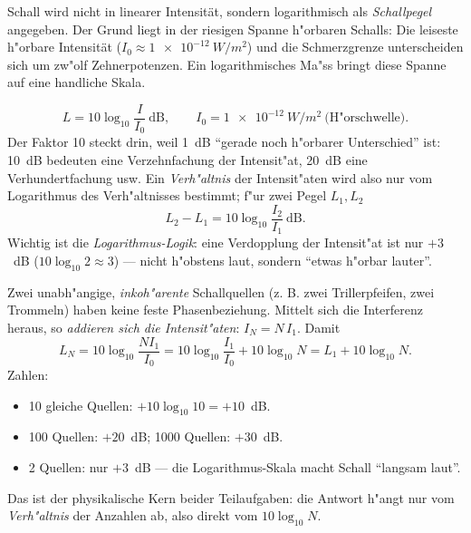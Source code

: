 

Schall wird nicht in linearer Intensität, sondern logarithmisch als
\emph{Schallpegel} angegeben. Der Grund liegt in der riesigen Spanne h"orbaren
Schalls: Die leiseste h"orbare Intensität ($I_0\approx\qty{1e-12}{W/m^2}$)
und die Schmerzgrenze unterscheiden sich um zw"olf Zehnerpotenzen. Ein
logarithmisches Ma"ss bringt diese Spanne auf eine handliche Skala.

\begin{werkzeugkasten}
\begin{equation}
  L=10\log_{10}\frac{I}{I_0}\ \mathrm{dB},\qquad
  I_0=\qty{1e-12}{W/m^2}\ \text{(H"orschwelle)}.
\end{equation}
Der Faktor 10 steckt drin, weil 1~dB ``gerade noch h"orbarer Unterschied''
ist: 10~dB bedeuten eine Verzehnfachung der Intensit"at, 20~dB eine
Verhundertfachung usw. Ein \emph{Verh"altnis} der Intensit"aten wird also nur
vom Logarithmus des Verh"altnisses bestimmt; f"ur zwei Pegel $L_1,L_2$
\begin{equation}
  L_2-L_1=10\log_{10}\frac{I_2}{I_1}\ \mathrm{dB}.
\end{equation}
Wichtig ist die \emph{Logarithmus-Logik}: eine Verdopplung der Intensit"at
ist nur $+3$~dB ($10\log_{10}2\approx3$) --- nicht h"obstens laut, sondern
``etwas h"orbar lauter''.
\end{werkzeugkasten}

\begin{werkzeugkasten}
Zwei unabh"angige, \emph{inkoh"arente} Schallquellen (z. B. zwei Trillerpfeifen,
zwei Trommeln) haben keine feste Phasenbeziehung. Mittelt sich die
Interferenz heraus, so \emph{addieren sich die Intensit"aten}: $I_N=N\,I_1$.
Damit
\begin{equation}
  L_N=10\log_{10}\frac{N I_1}{I_0}
  =10\log_{10}\frac{I_1}{I_0}+10\log_{10}N
  =L_1+10\log_{10}N.
\end{equation}
Zahlen:
\begin{itemize}
  \item 10 gleiche Quellen: $+10\log_{10}10=+10$~dB.
  \item 100 Quellen: $+20$~dB; 1000 Quellen: $+30$~dB.
  \item 2 Quellen: nur $+3$~dB --- die Logarithmus-Skala macht Schall
        ``langsam laut''.
\end{itemize}
Das ist der physikalische Kern beider Teilaufgaben: die Antwort h"angt nur
vom \emph{Verh"altnis} der Anzahlen ab, also direkt vom $10\log_{10}N$.
\end{werkzeugkasten}

